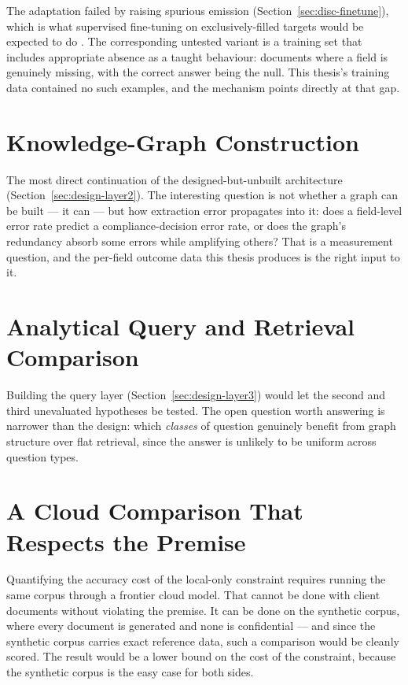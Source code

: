 The adaptation failed by raising spurious emission (Section~\ref{sec:disc-finetune}), which is what
supervised fine-tuning on exclusively-filled targets would be expected to do
\parencite{uluoglakci2026humility}. The corresponding untested variant is a training set that includes
appropriate absence as a taught behaviour: documents where a field is genuinely missing, with the
correct answer being the null. This thesis's training data contained no such examples, and the
mechanism points directly at that gap.

\section{Knowledge-Graph Construction}
\label{sec:fw-kg}

The most direct continuation of the designed-but-unbuilt architecture
(Section~\ref{sec:design-layer2}). The interesting question is not whether a graph can be built --- it
can --- but how extraction error propagates into it: does a field-level error rate predict a
compliance-decision error rate, or does the graph's redundancy absorb some errors while amplifying
others? That is a measurement question, and the per-field outcome data this thesis produces is the
right input to it.

\section{Analytical Query and Retrieval Comparison}
\label{sec:fw-query}

Building the query layer (Section~\ref{sec:design-layer3}) would let the second and third unevaluated
hypotheses be tested. The open question worth answering is narrower than the design: which
\emph{classes} of question genuinely benefit from graph structure over flat retrieval, since the
answer is unlikely to be uniform across question types.

\section{A Cloud Comparison That Respects the Premise}
\label{sec:fw-cloud}

Quantifying the accuracy cost of the local-only constraint requires running the same corpus
through a frontier cloud model. That cannot be done with client documents without violating the
premise. It can be done on the synthetic corpus, where every document is generated and none is
confidential --- and since the synthetic corpus carries exact reference data, such a comparison
would be cleanly scored. The result would be a lower bound on the cost of the constraint, because
the synthetic corpus is the easy case for both sides.

